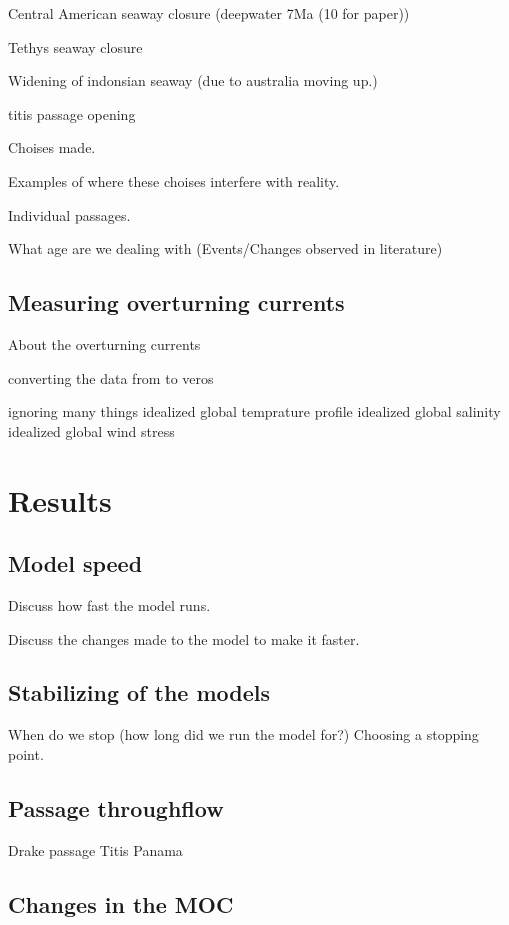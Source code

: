 \documentclass[a4paper]{article}
\begin{document}
\begin{multicols}{2}
Central American seaway closure \cite{Molnar2008Jun} (deepwater 7Ma (10 for paper))\cite{Pindell1988Dec}

Tethys seaway closure \cite{Hamon2013Nov}

Widening of indonsian seaway (due to australia moving up.)


titis passage opening 

Choises made. 

Examples of where these choises interfere with reality.

Individual passages.

What age are we dealing with (Events/Changes observed in literature)




\subsection{Measuring overturning currents}
About the overturning currents

converting the data from \cite{Muller2008Mar} to veros

ignoring many things
idealized global temprature profile
idealized global salinity
idealized global wind stress


\section{Results}

\subsection{Model speed}

Discuss how fast the model runs.

Discuss the changes made to the model to make it faster.


\subsection{Stabilizing of the models}
When do we stop (how long did we run the model for?)
Choosing a stopping point.


\subsection{Passage throughflow}

Drake passage
Titis
Panama

\subsection{Changes in the MOC}


\end{multicols}
\end{document}
